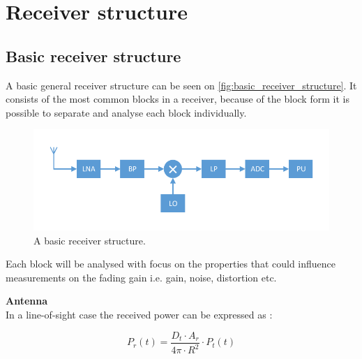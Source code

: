\chapter{Receiver structure}

\section{Basic receiver structure}
\label{basic_rev_struct}
A basic general receiver structure can be seen on \autoref{fig:basic_receiver_structure}. It consists of the most common blocks in a receiver, because of the block form it is possible to separate and analyse each block individually. 

\begin{figure}[H]
\centering
\includegraphics[width= \textwidth]{figures/Receiver.pdf}
\caption{A basic receiver structure.}
\label{fig:basic_receiver_structure}
\end{figure}

Each block will be analysed with focus on the properties that could influence measurements on the fading gain i.e. gain, noise, distortion etc.

\textbf{Antenna}\\
In a line-of-sight case the received power can be expressed as \citep[p. 86]{balanis}:

\begin{equation}
P_r(t) = \frac{D_t\cdot A_r}{4\pi\cdot R^2}\cdot P_t(t)
\end{equation} 
\begin{where}
\end{where}

